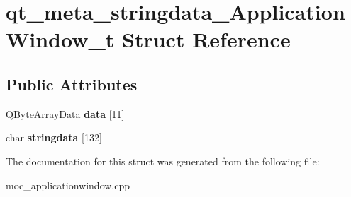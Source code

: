 \section{qt\-\_\-meta\-\_\-stringdata\-\_\-\-Application\-Window\-\_\-t Struct Reference}
\label{structqt__meta__stringdata___application_window__t}
\subsection*{Public Attributes}
\begin{DoxyCompactItemize}
\item 
Q\-Byte\-Array\-Data {\bfseries data} [11]\label{structqt__meta__stringdata___application_window__t_a50cb6669db072d15204e3a28d6a6b42b}

\item 
char {\bfseries stringdata} [132]\label{structqt__meta__stringdata___application_window__t_a1462c5c87e5eb4ceb8d2a85507f23a30}

\end{DoxyCompactItemize}


The documentation for this struct was generated from the following file\-:\begin{DoxyCompactItemize}
\item 
moc\-\_\-applicationwindow.\-cpp\end{DoxyCompactItemize}
